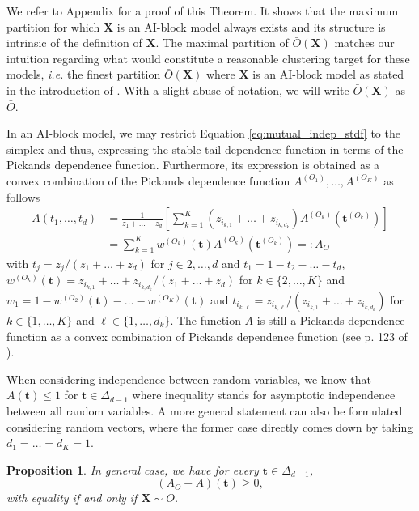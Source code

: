 \documentclass[11pt]{article}
\newtheorem{proposition}{Proposition}
\theoremstyle{definition}
\begin{document}
	We refer to Appendix for a proof of this Theorem. It shows that the maximum partition for which $\textbf{X}$ is an AI-block model always exists and its structure is intrinsic of the definition of $\textbf{X}$. The maximal partition of $\bar{O}(\textbf{X})$ matches our intuition regarding what would constitute a reasonable clustering target for these models, \emph{i.e.} the finest partition $\bar{O}(\textbf{X})$ where $\textbf{X}$ is an AI-block model as stated in the introduction of \cite{NIPS2017_37d097ca}. With a slight abuse of notation, we will write $\bar{O}(\textbf{X})$ as $\bar{O}$. 
	
	In an AI-block model, we may restrict Equation \eqref{eq:mutual_indep_stdf} to the simplex and thus, expressing the stable tail dependence function in terms of the Pickands dependence function. Furthermore, its expression is obtained as a convex combination of the Pickands dependence function $A^{(O_1)}, \dots, A^{(O_K)}$ as follows 
	\begin{align*}
		A(t_1, \dots, t_d) &= \frac{1}{z_1+\dots+z_d} \left[ \sum_{k=1}^K (z_{i_{k,1}} + \dots + z_{i_{k,d_k}}) A^{(O_k)}(\textbf{t}^{(O_k)}) \right] \\
		&= \sum_{k=1}^K w^{(O_k)}(\textbf{t}) A^{(O_k)}(\textbf{t}^{(O_k)}) =: A_O
	\end{align*}
	with $t_j = z_j / (z_1+\dots+z_d)$ for $j \in {2,\dots, d}$ and $t_1 = 1-t_2 - \dots - t_d$, $w^{(O_k)}(\textbf{t})  = z_{i_{k,1}} + \dots + z_{i_{k,d_k}} / (z_1 + \dots + z_{d})$ for $k \in \{2, \dots, K\}$ and $w_1 = 1-w^{(O_2)}(\textbf{t})-\dots -w^{(O_K)}(\textbf{t})$ and $t_{i_{k,\ell}} = z_{i_{k,\ell}} / (z_{i_{k,1}} + \dots + z_{i_{k,d_k}})$ for $k \in \{1, \dots, K\}$ and $\ell \in \{1, \dots, d_k\}$. The function $A$ is still a Pickands dependence function as a convex combination of Pickands dependence function (see p. 123 of \cite{falk2010laws}).
	
	When considering independence between random variables, we know that $A(\textbf{t}) \leq 1$ for $\textbf{t} \in \Delta_{d-1}$ where inequality stands for asymptotic independence between all random variables. A more general statement can also be formulated considering random vectors, where the former case directly comes down by taking $d_1 = \dots = d_K = 1$.
	
	\begin{proposition}
	\label{prop:ineq}
		In general case, we have for every $\textbf{t} \in \Delta_{d-1}$, 
		\begin{equation*}
			\left(A_{O} - A\right) (\textbf{t}) \geq 0,
		\end{equation*}
		with equality if and only if $\textbf{X} \sim O$.
	\end{proposition}
	
\end{document}
